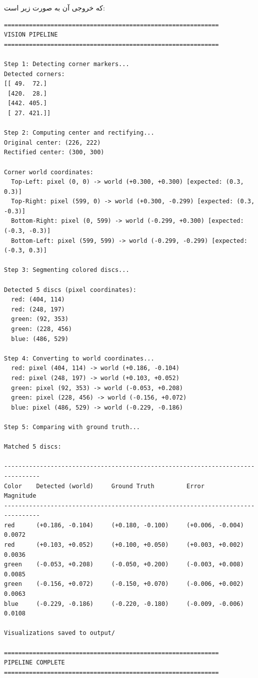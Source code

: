 \documentclass{article}
\begin{document}
که خروجی آن به صورت زیر است:
\begin{latin}
\begin{LTR}
\begin{verbatim}
============================================================
VISION PIPELINE
============================================================

Step 1: Detecting corner markers...
Detected corners:
[[ 49.  72.]
 [420.  28.]
 [442. 405.]
 [ 27. 421.]]

Step 2: Computing center and rectifying...
Original center: (226, 222)
Rectified center: (300, 300)

Corner world coordinates:
  Top-Left: pixel (0, 0) -> world (+0.300, +0.300) [expected: (0.3, 0.3)]
  Top-Right: pixel (599, 0) -> world (+0.300, -0.299) [expected: (0.3, -0.3)]
  Bottom-Right: pixel (0, 599) -> world (-0.299, +0.300) [expected: (-0.3, -0.3)]
  Bottom-Left: pixel (599, 599) -> world (-0.299, -0.299) [expected: (-0.3, 0.3)]

Step 3: Segmenting colored discs...

Detected 5 discs (pixel coordinates):
  red: (404, 114)
  red: (248, 197)
  green: (92, 353)
  green: (228, 456)
  blue: (486, 529)

Step 4: Converting to world coordinates...
  red: pixel (404, 114) -> world (+0.186, -0.104)
  red: pixel (248, 197) -> world (+0.103, +0.052)
  green: pixel (92, 353) -> world (-0.053, +0.208)
  green: pixel (228, 456) -> world (-0.156, +0.072)
  blue: pixel (486, 529) -> world (-0.229, -0.186)

Step 5: Comparing with ground truth...

Matched 5 discs:

--------------------------------------------------------------------------------
Color    Detected (world)     Ground Truth         Error                Magnitude 
--------------------------------------------------------------------------------
red      (+0.186, -0.104)     (+0.180, -0.100)     (+0.006, -0.004)     0.0072    
red      (+0.103, +0.052)     (+0.100, +0.050)     (+0.003, +0.002)     0.0036    
green    (-0.053, +0.208)     (-0.050, +0.200)     (-0.003, +0.008)     0.0085    
green    (-0.156, +0.072)     (-0.150, +0.070)     (-0.006, +0.002)     0.0063    
blue     (-0.229, -0.186)     (-0.220, -0.180)     (-0.009, -0.006)     0.0108    

Visualizations saved to output/

============================================================
PIPELINE COMPLETE
============================================================
\end{verbatim}
\end{LTR}
\end{latin}
\end{document}
